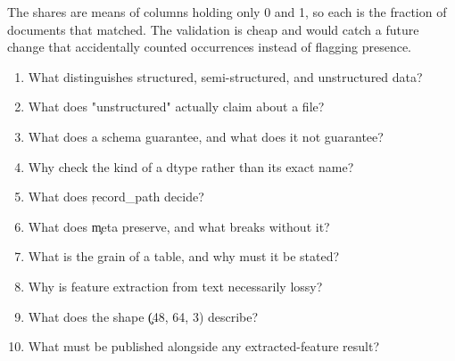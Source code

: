 The shares are means of columns holding only 0 and 1, so each is the fraction of
documents that matched. The validation is cheap and would catch a future change
that accidentally counted occurrences instead of flagging presence.


\begin{enumerate}
    \item What distinguishes structured, semi-structured, and unstructured data?
    \item What does "unstructured" actually claim about a file?
    \item What does a schema guarantee, and what does it not guarantee?
    \item Why check the kind of a dtype rather than its exact name?
    \item What does \c{record_path} decide?
    \item What does \c{meta} preserve, and what breaks without it?
    \item What is the grain of a table, and why must it be stated?
    \item Why is feature extraction from text necessarily lossy?
    \item What does the shape \c{(48, 64, 3)} describe?
    \item What must be published alongside any extracted-feature result?
\end{enumerate}


